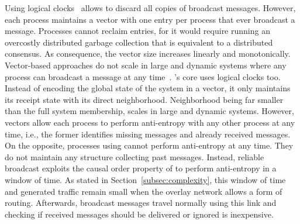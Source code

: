 Using logical clocks~\cite{malkhi2007concise,mukund2014optimized} allows to
discard all copies of broadcast messages. However, each process maintains a
vector with one entry per process that ever broadcast a message.  Processes
cannot reclaim entries, for it would require running an overcostly distributed
garbage collection that is equivalent to a distributed consensus. As
consequence, the vector size increases linearly and monotonically. Vector-based
approaches do not scale in large and dynamic systems where any process can
broadcast a message at any time~\cite{nedelec2016crate}. \RPCBROADCAST's core
uses logical clocks too. Instead of encoding the global state of the system in a
vector, it only maintains its receipt state with its direct
neighborhood. Neighborhood being far smaller than the full system membership,
\RPCBROADCAST scales in large and dynamic systems. However, vectors allow each
process to perform anti-entropy with any other process at any time, i.e., the
former identifies missing messages and already received messages. On the
opposite, processes using \RPCBROADCAST cannot perform anti-entropy at any
time. They do not maintain any structure collecting past messages. Instead,
reliable broadcast exploits the causal order property of \RPCBROADCAST to
perform anti-entropy in a window of time. As stated in
Section~\ref{subsec:complexity}, this window of time and generated traffic
remain small when the overlay network allows a form of routing. Afterwards,
broadcast messages travel normally using this link and checking if received
messages should be delivered or ignored is inexpensive.



